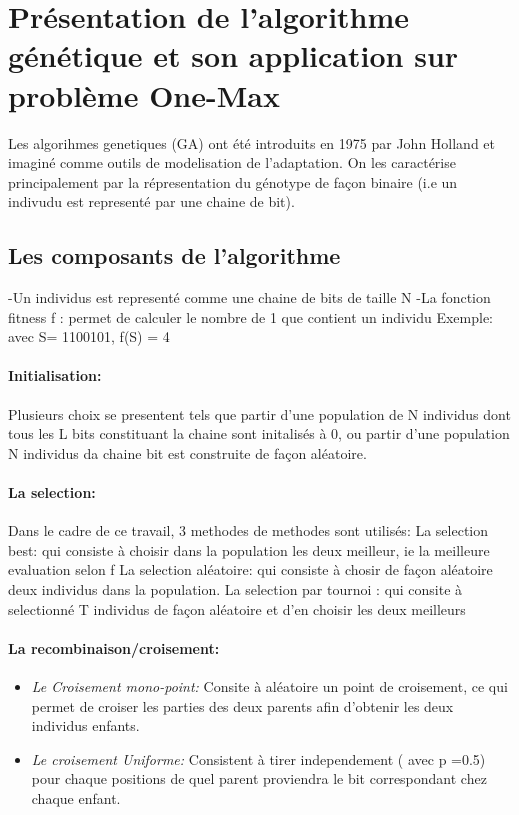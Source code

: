 \documentclass{article}
\begin{document}
\section{Présentation de l'algorithme génétique et son application sur problème One-Max}

Les algorihmes genetiques (GA) ont été introduits en 1975 par John Holland et imaginé comme outils de modelisation de l'adaptation. On les caractérise principalement par la répresentation du génotype de façon binaire (i.e un indivudu est representé par une chaine de bit).

\subsection{Les composants de l'algorithme}

-Un individus est representé comme une chaine de bits de taille N
-La fonction fitness f : permet de calculer le nombre de 1 que contient un individu
	Exemple: avec S= 1100101, f(S) = 4
	
\paragraph{Initialisation:}
Plusieurs choix se presentent tels que partir d'une population de N individus dont tous les L bits constituant la chaine sont initalisés à 0, ou partir d'une population N individus da chaine bit est construite de façon aléatoire.
\paragraph{La selection:}
Dans le cadre de ce travail, 3 methodes de methodes sont utilisés: 
La selection best: qui consiste à choisir dans la population les deux meilleur, ie la meilleure evaluation selon f
La selection aléatoire: qui consiste à chosir de façon aléatoire deux individus dans la population.
La selection par tournoi : qui consite à selectionné T individus de façon aléatoire et d'en choisir les deux meilleurs

\paragraph{La recombinaison/croisement:}
\begin{itemize}
    \item \emph{Le Croisement mono-point:} Consite à aléatoire un point de croisement, ce qui permet de croiser les parties des deux parents afin d'obtenir les deux individus enfants.
    \item \emph{Le croisement Uniforme:} Consistent à tirer independement ( avec p =0.5) pour chaque positions de quel parent proviendra le bit correspondant chez chaque enfant.
\end{itemize}
\end{document}
